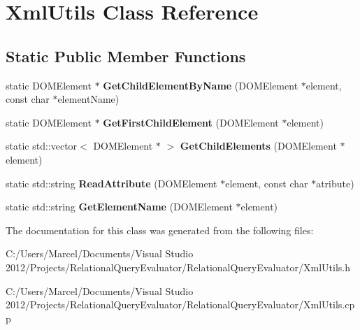 \hypertarget{class_xml_utils}{\section{Xml\+Utils Class Reference}
\label{class_xml_utils}
}
\subsection*{Static Public Member Functions}
\begin{DoxyCompactItemize}
\item 
\hypertarget{class_xml_utils_a657d5ac4fb8383745b85e7bf81b4cb0a}{static D\+O\+M\+Element $\ast$ {\bfseries Get\+Child\+Element\+By\+Name} (D\+O\+M\+Element $\ast$element, const char $\ast$element\+Name)}\label{class_xml_utils_a657d5ac4fb8383745b85e7bf81b4cb0a}

\item 
\hypertarget{class_xml_utils_a5c7a6b135f074beade050a508b6f64be}{static D\+O\+M\+Element $\ast$ {\bfseries Get\+First\+Child\+Element} (D\+O\+M\+Element $\ast$element)}\label{class_xml_utils_a5c7a6b135f074beade050a508b6f64be}

\item 
\hypertarget{class_xml_utils_a7177dd1569d717224308a40ef025902d}{static std\+::vector$<$ D\+O\+M\+Element $\ast$ $>$ {\bfseries Get\+Child\+Elements} (D\+O\+M\+Element $\ast$element)}\label{class_xml_utils_a7177dd1569d717224308a40ef025902d}

\item 
\hypertarget{class_xml_utils_a4eed191983df809da662f9913bca0546}{static std\+::string {\bfseries Read\+Attribute} (D\+O\+M\+Element $\ast$element, const char $\ast$atribute)}\label{class_xml_utils_a4eed191983df809da662f9913bca0546}

\item 
\hypertarget{class_xml_utils_a915f9bd1d5d359914acf37fb5f0f40a7}{static std\+::string {\bfseries Get\+Element\+Name} (D\+O\+M\+Element $\ast$element)}\label{class_xml_utils_a915f9bd1d5d359914acf37fb5f0f40a7}

\end{DoxyCompactItemize}


The documentation for this class was generated from the following files\+:\begin{DoxyCompactItemize}
\item 
C\+:/\+Users/\+Marcel/\+Documents/\+Visual Studio 2012/\+Projects/\+Relational\+Query\+Evaluator/\+Relational\+Query\+Evaluator/Xml\+Utils.\+h\item 
C\+:/\+Users/\+Marcel/\+Documents/\+Visual Studio 2012/\+Projects/\+Relational\+Query\+Evaluator/\+Relational\+Query\+Evaluator/Xml\+Utils.\+cpp\end{DoxyCompactItemize}
